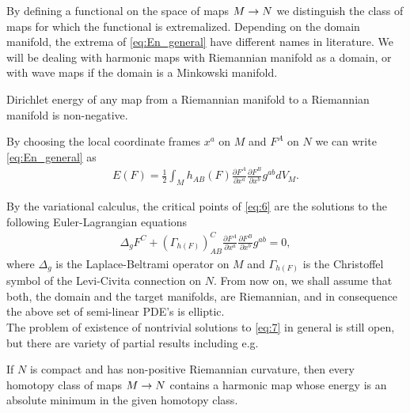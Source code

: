 By defining a functional on the space of maps $M\rightarrow N$ we distinguish
the class of maps for which the functional is extremalized. Depending
on the domain manifold, the extrema of \eqref{eq:En_general} have
different names in literature. We will be dealing with harmonic maps
with Riemannian manifold as a domain, or with wave maps if the domain
is a Minkowski manifold.

\begin{remark}
  Dirichlet energy of any map from a Riemannian manifold to a
  Riemannian manifold is non-negative.
\end{remark}

By choosing the local coordinate frames
$x^a$ on $M$ and $F^A$ on $N$ we can write \eqref{eq:En_general} as
\begin{align}
  \label{eq:6}
  E(F)=\frac{1}{2}\int_M h_{AB}(F)\frac{\partial F^A}{\partial
    x^a}\frac{\partial F^B}{\partial x^b}g^{ab}dV_M.
\end{align}

By the variational calculus, the critical points of \eqref{eq:6} are
the solutions to the following Euler-Lagrangian equations
\begin{align}
  \label{eq:7}
  \Delta_g F^C+(\Gamma_{h(F)})_{AB}^{C}\frac{\partial F^A}{\partial
    x^a}\frac{\partial F^B}{\partial x^b}g^{ab}=0,
\end{align}
where $\Delta_g$ is the Laplace-Beltrami operator on $M$ and
$\Gamma_{h(F)}$ is the Christoffel symbol of the Levi-Civita
connection on $N$. From now on, we shall assume that both, the domain
and the target manifolds, are Riemannian, and in consequence the above
set of semi-linear PDE's is elliptic.\\

The problem of existence of nontrivial solutions to \eqref{eq:7} in
general is still open, but there are variety of partial results
including e.g.

\begin{theorem}\label{thm:Eells-Sampson}
  If $N$ is compact and has non-positive Riemannian curvature, then
  every homotopy class of maps $M\rightarrow N$ contains a harmonic map whose
  energy is an absolute minimum in the given homotopy class.
\end{theorem}

